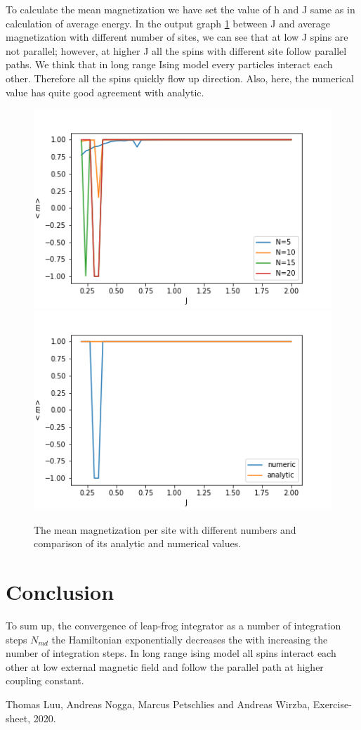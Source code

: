 \documentclass[11pt, a4paper, DIV=12]{scrartcl}
\begin{document}
To calculate the mean magnetization we have set the value of h and J same as in calculation of average energy. In the output graph \ref{fig:magnetization} between J and average magnetization with different number of sites, we can see that at low J spins are not parallel; however, at higher J all the spins with different site follow parallel paths. We think that in long range Ising model every particles interact each other. Therefore all the spins quickly flow up direction. Also, here, the numerical value has quite good agreement with analytic. 
\begin{figure}[H]
	\centering
	\includegraphics[width=0.6\linewidth]{magnitization.png}\includegraphics[width=0.6\linewidth]{magnitization_comparision.png}
	\caption{The mean magnetization per site with different numbers and comparison of its analytic and numerical values.}
	\label{fig:magnetization}
\end{figure}

\section{Conclusion}
To sum up, the convergence of leap-frog integrator as a number of integration steps $ N_{md}$ the Hamiltonian exponentially decreases the with increasing the number of integration steps. In long range ising model all spins interact each other at low external magnetic field and follow the parallel path at higher  coupling constant. 
\begin{thebibliography}{12}
	Thomas Luu, Andreas Nogga, Marcus Petschlies and  Andreas Wirzba, Exercise-sheet, 2020. 
	
	
\end{thebibliography}	
\end{document}
